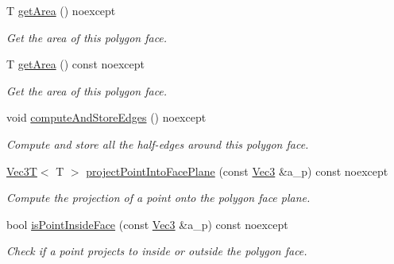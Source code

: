 \begin{DoxyCompactItemize}
\mbox{\label{classDcel_1_1FaceT_aeddb2fe440acd3dadc6160be390127fe}} 
T \hyperlink{classDcel_1_1FaceT_aeddb2fe440acd3dadc6160be390127fe}{get\+Area} () noexcept
\begin{DoxyCompactList}\small\item\em Get the area of this polygon face. \end{DoxyCompactList}\item 
\mbox{\label{classDcel_1_1FaceT_ab5352c13f01b1d2ec8fbd630d4c01083}} 
T \hyperlink{classDcel_1_1FaceT_ab5352c13f01b1d2ec8fbd630d4c01083}{get\+Area} () const noexcept
\begin{DoxyCompactList}\small\item\em Get the area of this polygon face. \end{DoxyCompactList}\item 
\mbox{\label{classDcel_1_1FaceT_a5e913d5cdebb6b95c43e6e0fdc2e3589}} 
void \hyperlink{classDcel_1_1FaceT_a5e913d5cdebb6b95c43e6e0fdc2e3589}{compute\+And\+Store\+Edges} () noexcept
\begin{DoxyCompactList}\small\item\em Compute and store all the half-\/edges around this polygon face. \end{DoxyCompactList}\item 
\hyperlink{classVec3T}{Vec3T}$<$ T $>$ \hyperlink{classDcel_1_1FaceT_af4116b8f72e0dfb797f79cd4f27a71e8}{project\+Point\+Into\+Face\+Plane} (const \hyperlink{classDcel_1_1FaceT_ade9c182834ec6f18a0e17b8140308db2}{Vec3} \&a\+\_\+p) const noexcept
\begin{DoxyCompactList}\small\item\em Compute the projection of a point onto the polygon face plane. \end{DoxyCompactList}\item 
bool \hyperlink{classDcel_1_1FaceT_a628d1734a63636a528fe2f7019bc4dd8}{is\+Point\+Inside\+Face} (const \hyperlink{classDcel_1_1FaceT_ade9c182834ec6f18a0e17b8140308db2}{Vec3} \&a\+\_\+p) const noexcept
\begin{DoxyCompactList}\small\item\em Check if a point projects to inside or outside the polygon face. \end{DoxyCompactList}\end{DoxyCompactItemize}

